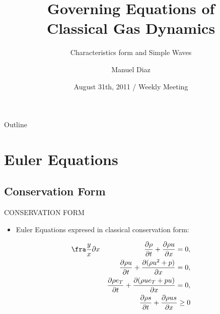 \documentclass{beamer}
\title[Governing Equations] %
{Governing Equations of \\ Classical Gas Dynamics}
\subtitle
{Characteristics form and Simple Waves} %
\author[Manuel Diaz] %
{Manuel Diaz\inst{1} }
\institute[National Taiwan University] %
{
  \inst{1}%
  National Taiwan University\\
  Institute of Applied Mechanics}
\date[August 31th, 2011] %
{August 31th, 2011 / Weekly Meeting}
\begin{document}
\begin{frame}
  \titlepage
\end{frame}

\begin{frame}{Outline}
  \tableofcontents
\end{frame}




\section{Euler Equations}

\subsection{Conservation Form}

\begin{frame}{CONSERVATION FORM}
  \begin{itemize}
   \item Euler Equations expresed in classical conservation form:
  \end{itemize}
  \begin{eqnarray}
    \fra\frac{y}{x}\partial x
    &&\frac{\partial{\rho}}{\partial{t}}+\frac{\partial{{\rho}{u}}}{\partial{x}}=0, \\
    &&\frac{\partial{{\rho}u}}{\partial{t}}+\frac{\partial{({\rho}{u^2}+p})}{\partial{x}}=0, \\
    &&\frac{\partial{\rho}e_T}{\partial{t}}+\frac{\partial{({\rho}{u}e_T+pu})}{\partial{x}}=0, \\
    &&\frac{\partial{\rho}s}{\partial{t}}+\frac{\partial{{\rho}{u}s}}{\partial{x}}\geq 0
  \end{eqnarray} 
\end{frame}
\end{document}
